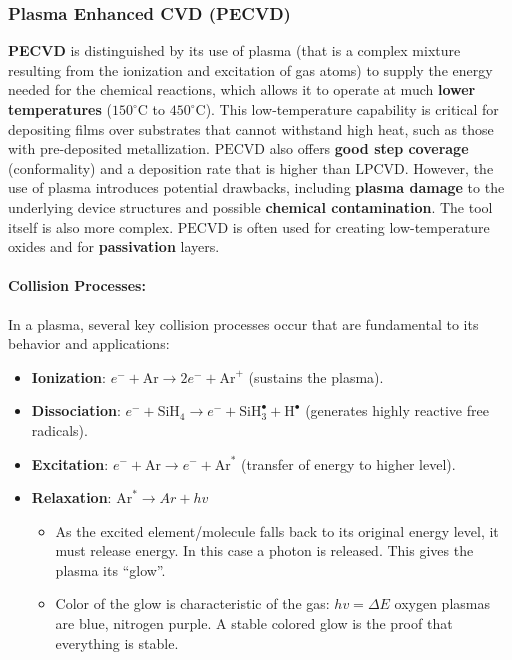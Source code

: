 \documentclass{report}
\begin{document}
\subsubsection{Plasma Enhanced CVD (PECVD)}

\textbf{PECVD} is distinguished by its use of plasma (that is a complex mixture resulting from the ionization and excitation of gas atoms) to supply the energy needed for the chemical reactions, which allows it to operate at much \textbf{lower temperatures} ($150^\circ\text{C}$ to $450^\circ\text{C}$). This low-temperature capability is critical for depositing films over substrates that cannot withstand high heat, such as those with pre-deposited metallization. $\text{PECVD}$ also offers \textbf{good step coverage} (conformality) and a deposition rate that is higher than $\text{LPCVD}$. However, the use of plasma introduces potential drawbacks, including \textbf{plasma damage} to the underlying device structures and possible \textbf{chemical contamination}. The tool itself is also more complex. $\text{PECVD}$ is often used for creating low-temperature oxides and for \textbf{passivation} layers.
\paragraph{Collision Processes:} In a plasma, several key collision processes occur that are fundamental to its behavior and applications:
\begin{itemize}
    \item \textbf{Ionization}: $e^{-}+\text{Ar}\rightarrow 2e^{-}+\text{Ar}^{+}$ (sustains the plasma).
    \item \textbf{Dissociation}: $e^{-}+\text{SiH}_4\rightarrow e^{-}+\text{SiH}_3^{\bullet}+\text{H}^{\bullet}$ (generates highly reactive free radicals).
    \item \textbf{Excitation}: $e^{-}+\text{Ar}\rightarrow e^{-}+\text{Ar}^{*}$ (transfer of energy to higher level).
    \item \textbf{Relaxation}: $\text{Ar}^{*}\rightarrow Ar+hv$
    \begin{itemize}
    \item As the excited element/molecule falls back to its original energy level, it must release energy. In this case a photon is released. This gives the plasma its “glow”.
    \item Color of the glow is characteristic of the gas: $hv=\Delta E$ oxygen plasmas are blue, nitrogen purple. A stable colored glow is the proof that everything is stable.
    \end{itemize}
\end{itemize}
\end{document}
